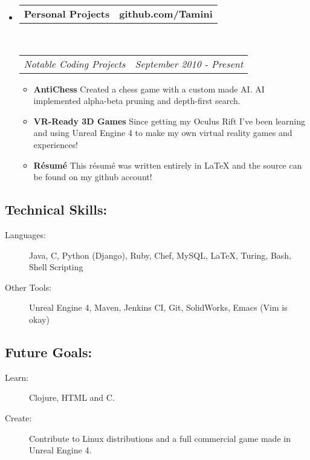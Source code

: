 \documentclass[11pt]{article} %
\makeatletter
\newcommand{\CPP}
{C\nolinebreak[4]\hspace{-.05em}\raisebox{.22ex}{\footnotesize\bf ++}}
\newcommand{\headerrow}[2]
{\begin{tabular*}{\linewidth}{l@{\extracolsep{\fill}}r}
	#1 &
	#2 \\
\end{tabular*}}
\makeatother
\begin{document}
\begin{itemize}
\begin{itemize}
	\end{itemize}
	\item
	\headerrow
		{\textbf{Personal Projects}}
		{\textbf{github.com/Tamini}}
	\\
	\headerrow
		{\emph{Notable Coding Projects}}
		{\emph{September 2010 - Present}}
	\begin{itemize}
		\item {\bf AntiChess} Created a chess game with a custom made AI. AI implemented alpha-beta pruning and depth-first search.
		\item {\bf VR-Ready 3D Games} Since getting my Oculus Rift I've been learning and using Unreal Engine 4 to make my own virtual reality games and experiences!
		\item {\bf R\'{e}sum\'{e}} This r\'{e}sum\'{e} was written entirely in LaTeX and the source can be found on my github account!
	\end{itemize}

\end{itemize}
\subsection*{Technical Skills:}
\begin{description}
	\item[Languages:] Java, \CPP, Python (Django), Ruby, Chef, MySQL, \LaTeX, Turing, Bash, Shell Scripting
	\item[Other Tools:] Unreal Engine 4, Maven, Jenkins CI, Git, SolidWorks, Emacs (Vim is okay)
\end{description}
\subsection*{Future Goals:}
\begin{description}
	\item[Learn:] Clojure, HTML and C.
	\item[Create:] Contribute to Linux distributions and a full commercial game made in Unreal Engine 4.
\end{description}
\end{document}
